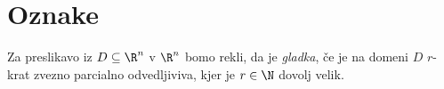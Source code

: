 \chapter{Oznake}

Za preslikavo iz $D\subseteq\R^n$ v $\R^n$ bomo rekli, da je \emph{gladka}, če je
na domeni $D$ $r$-krat zvezno parcialno odvedljiviva, kjer je $r\in\N$ dovolj velik.